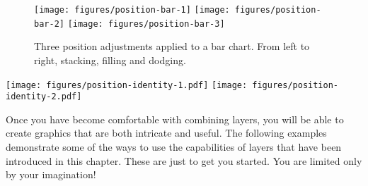 \begin{Shaded}
\begin{Highlighting}[]
\StringTok{ } 
\StringTok{ }\NormalTok{(} \NormalTok{)}
\StringTok{ }\NormalTok{(} \NormalTok{)}
\StringTok{ }\NormalTok{(} \NormalTok{)}
\end{Highlighting}
\end{Shaded}

\begin{figure}
\texttt{[image: figures/position-bar-1]} \texttt{[image: figures/position-bar-2]} \texttt{[image: figures/position-bar-3]} \caption{Three position adjustments applied to a bar chart.  From left to right, stacking, filling and dodging.\label{fig:position-bar}}
\end{figure}

\begin{Shaded}
\begin{Highlighting}[]
\StringTok{ }\NormalTok{(} \NormalTok{)}
 \NormalTok{, } 
  \NormalTok{, }
\end{Highlighting}
\end{Shaded}

\texttt{[image: figures/position-identity-1.pdf]}
\texttt{[image: figures/position-identity-2.pdf]}


Once you have become comfortable with combining layers, you will be able
to create graphics that are both intricate and useful. The following
examples demonstrate some of the ways to use the capabilities of layers
that have been introduced in this chapter. These are just to get you
started. You are limited only by your imagination!


